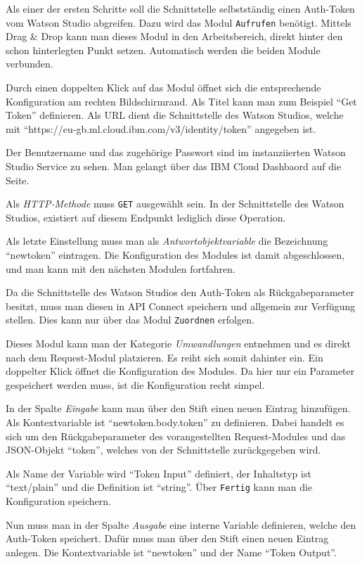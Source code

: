 Als einer der ersten Schritte soll die Schnittstelle selbstständig einen Auth-Token vom Watson Studio abgreifen. Dazu
wird das Modul \texttt{Aufrufen} benötigt. Mittels Drag \& Drop kann man dieses Modul in den Arbeitsbereich, direkt
hinter den schon hinterlegten Punkt setzen. Automatisch werden die beiden Module verbunden.

Durch einen doppelten Klick auf das Modul öffnet sich die entsprechende Konfiguration am rechten Bildschirmrand. Als
Titel kann man zum Beispiel \enquote{Get Token} definieren. Als URL dient die Schnittstelle des Watson Studios, welche
mit \enquote{https://eu-gb.ml.cloud.ibm.com/v3/identity/token} angegeben ist.

Der Benutzername und das zugehörige Passwort sind im instanziierten Watson Studio Service zu sehen. Man gelangt über das
IBM Cloud Dashbaord auf die Seite.

Als \textit{HTTP-Methode} muss \texttt{GET} ausgewählt sein. In der Schnittstelle des Watson Studios, existiert auf
diesem Endpunkt lediglich diese Operation.

Als letzte Einstellung muss man als \textit{Antwortobjektvariable} die Bezeichnung \enquote{newtoken} eintragen. Die
Konfiguration des Modules ist damit abgeschlossen, und man kann mit den nächsten Modulen fortfahren.

Da die Schnittstelle des Watson Studios den Auth-Token als Rückgabeparameter besitzt, muss man diesen in API Connect
speichern und allgemein zur Verfügung stellen. Dies kann nur über das Modul \texttt{Zuordnen} erfolgen.

Dieses Modul kann man der Kategorie \textit{Umwandlungen} entnehmen und es direkt nach dem Request-Modul platzieren. Es
reiht sich somit dahinter ein. Ein doppelter Klick öffnet die Konfiguration des Modules. Da hier nur ein Parameter
gespeichert werden muss, ist die Konfiguration recht simpel.

In der Spalte \textit{Eingabe} kann man über den Stift einen neuen Eintrag hinzufügen. Als Kontextvariable ist
\enquote{newtoken.body.token} zu definieren. Dabei handelt es sich um den Rückgabeparameter des vorangestellten
Request-Modules und das JSON-Objekt \enquote{token}, welches von der Schnittstelle zurückgegeben wird.

Als Name der Variable wird \enquote{Token Input} definiert, der Inhaltstyp ist \enquote{text/plain} und die Definition
ist \enquote{string}. Über \texttt{Fertig} kann man die Konfiguration speichern.

Nun muss man in der Spalte \textit{Ausgabe} eine interne Variable definieren, welche den Auth-Token speichert. Dafür
muss man über den Stift einen neuen Eintrag anlegen. Die Kontextvariable ist \enquote{newtoken} und der Name
\enquote{Token Output}.

